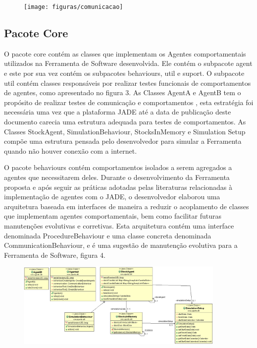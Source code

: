 \begin{apendicesenv}
\begin{figure}[h]
\centering
\label{f2}
\texttt{[image: figuras/comunicacao]}
\end{figure}

\subsection{Pacote Core}

O pacote core contém as classes que implementam os Agentes comportamentais utilizados na Ferramenta de Software desenvolvida. Ele contém o subpacote agent e este por sua vez contém  os subpacotes behaviours,  util e suport.   O subpacote util contém classes responsáveis por realizar testes funcionais de comportamentos de agentes, como apresentado no figura 3.   As Classes AgentA e AgentB tem o propósito de realizar  testes de comunicação e comportamentos , esta estratégia foi necessária uma vez que a plataforma JADE até a data de publicação deste documento carecia uma estrutura adequada para testes de comportamentos. As Classes StockAgent, SimulationBehaviour, StocksInMemory e Simulation Setup compõe uma estrutura pensada pelo desenvolvedor para simular a Ferramenta quando não houver conexão com a internet.

O pacote behaviours contém comportamentos isolados a serem agregados a agentes que necessitarem deles. Durante o desenvolvimento da Ferramenta proposta e após seguir as práticas adotadas pelas literaturas relacionadas à implementação de agentes com o JADE, o desenvolvedor elaborou uma arquitetura baseada em interfaces de maneira a reduzir o acoplamento de classes que implementam agentes comportamentais, bem como facilitar futuras manutenções evolutivas e corretivas. Esta arquitetura contém uma interface denominada ProcedureBehaviour e uma classe concreta denominada CommunicationBehaviour, e é uma sugestão de manutenção evolutiva para a Ferramenta de Software, figura 4.

\begin{figure}[h]
\centering
\label{f3}
\includegraphics[width=0.9\textwidth]{figuras/pacoteAgents_Util}
\end{figure}


\end{apendicesenv}
